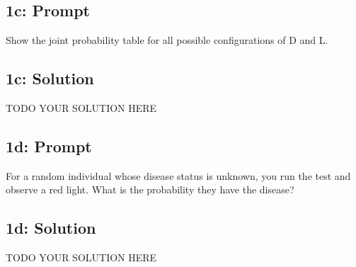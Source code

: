 \documentclass[12pt]{article}
\newcommand{\officialdirections}[1]{{\color{blue} #1}}
\begin{document}
\officialdirections{
\subsection*{1c: Prompt}

Show the joint probability table for all possible configurations of D and L.
}

\subsection{1c: Solution}
TODO YOUR SOLUTION HERE

\officialdirections{
\subsection*{1d: Prompt}

For a random individual whose disease status is unknown, you run the test and observe a red light. What is the probability they have the disease?
}

\subsection{1d: Solution}
TODO YOUR SOLUTION HERE
\end{document}
